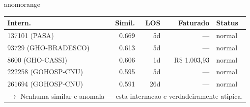 \documentclass[a4paper,10pt]{article}
\begin{document}
\begin{anomalycard}[Internacao 165811 | GHO-PETROBRAS | ALTO (z=3.01)]{anomorange}
\begin{tabular}{l r r r l}\toprule\textbf{Intern.} & \textbf{Simil.} & \textbf{LOS} & \textbf{Faturado} & \textbf{Status} \\\midrule
137101 (PASA) & 0.669 & 5d & --- & \textcolor{jcubeblue}{normal} \\
93729 (GHO-BRADESCO) & 0.613 & 5d & --- & \textcolor{jcubeblue}{normal} \\
8600 (GHO-CASSI) & 0.606 & 1d & R\$ 1.003,93 & \textcolor{jcubeblue}{normal} \\
222258 (GOHOSP-CNU) & 0.595 & 5d & --- & \textcolor{jcubeblue}{normal} \\
261694 (GOHOSP-CNU) & 0.591 & 26d & --- & \textcolor{jcubeblue}{normal} \\
\multicolumn{5}{l}{\textcolor{jcubeblue}{\small $\rightarrow$ Nenhuma similar e anomala --- esta internacao e verdadeiramente atipica.}} \\
\bottomrule\end{tabular}


\end{anomalycard}

\newpage
\end{document}
